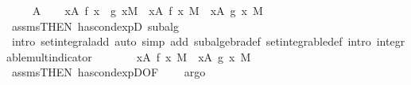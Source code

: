 \begin{isabellebody}
\ \ \isamarkupfalse%
\ {\isacharparenleft}{\kern0pt}{}\ A{\isacharparenright}{\kern0pt}\isanewline
\ \ \isamarkupfalse%
\ {\isachardoublequoteopen}{\isasymintegral}x{\isasymin}A{\isachardot}{\kern0pt}\ {\isacharparenleft}{\kern0pt}f\ x\ {\isacharplus}{\kern0pt}\ g\ x{\isacharparenright}{\kern0pt}{\isasympartial}M\ {\isacharequal}{\kern0pt}\ {\isacharparenleft}{\kern0pt}{\isasymintegral}x{\isasymin}A{\isachardot}{\kern0pt}\ f\ x\ {\isasympartial}M{\isacharparenright}{\kern0pt}\ {\isacharplus}{\kern0pt}\ {\isacharparenleft}{\kern0pt}{\isasymintegral}x{\isasymin}A{\isachardot}{\kern0pt}\ g\ x\ {\isasympartial}M{\isacharparenright}{\kern0pt}{\isachardoublequoteclose}\ \isamarkupfalse%
\ assms{\isacharbrackleft}{\kern0pt}THEN\ has{\isacharunderscore}{\kern0pt}cond{\isacharunderscore}{\kern0pt}expD{\isacharparenleft}{\kern0pt}{}{\isacharparenright}{\kern0pt}{\isacharbrackright}{\kern0pt}\ subalg\ {}\ \isamarkupfalse%
\ {\isacharparenleft}{\kern0pt}intro\ set{\isacharunderscore}{\kern0pt}integral{\isacharunderscore}{\kern0pt}add{\isacharparenleft}{\kern0pt}{}{\isacharparenright}{\kern0pt}{\isacharcomma}{\kern0pt}\ auto\ simp\ add{\isacharcolon}{\kern0pt}\ subalgebra{\isacharunderscore}{\kern0pt}def\ set{\isacharunderscore}{\kern0pt}integrable{\isacharunderscore}{\kern0pt}def\ intro{\isacharcolon}{\kern0pt}\ integrable{\isacharunderscore}{\kern0pt}mult{\isacharunderscore}{\kern0pt}indicator{\isacharparenright}{\kern0pt}\isanewline
\ \ \isamarkupfalse%
\ \isamarkupfalse%
\ {\isachardoublequoteopen}{\isachardot}{\kern0pt}{\isachardot}{\kern0pt}{\isachardot}{\kern0pt}\ {\isacharequal}{\kern0pt}\ {\isacharparenleft}{\kern0pt}{\isasymintegral}x{\isasymin}A{\isachardot}{\kern0pt}\ f{\isacharprime}{\kern0pt}\ x\ {\isasympartial}M{\isacharparenright}{\kern0pt}\ {\isacharplus}{\kern0pt}\ {\isacharparenleft}{\kern0pt}{\isasymintegral}x{\isasymin}A{\isachardot}{\kern0pt}\ g{\isacharprime}{\kern0pt}\ x\ {\isasympartial}M{\isacharparenright}{\kern0pt}{\isachardoublequoteclose}\ \isamarkupfalse%
\ assms{\isacharbrackleft}{\kern0pt}THEN\ has{\isacharunderscore}{\kern0pt}cond{\isacharunderscore}{\kern0pt}expD{\isacharparenleft}{\kern0pt}{}{\isacharparenright}{\kern0pt}{\isacharbrackleft}{\kern0pt}OF\ {\isacharunderscore}{\kern0pt}\ {}{\isacharbrackright}{\kern0pt}{\isacharbrackright}{\kern0pt}\ \isamarkupfalse%
\ argo\isanewline
\ \ \isamarkupfalse%
\ \isamarkupfalse%

\end{isabellebody}
